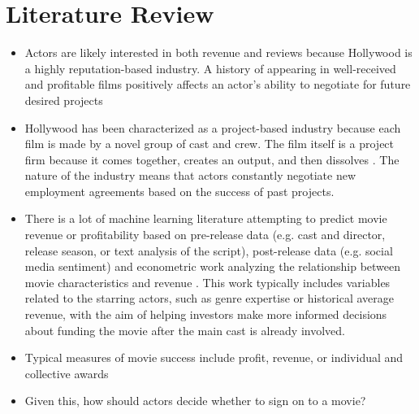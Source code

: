 \documentclass{article}
\begin{document}
\section{Literature Review}
\begin{itemize}
    \item Actors are likely interested in both revenue and reviews because Hollywood is a highly reputation-based industry. A history of appearing in well-received and profitable films positively affects an actor's ability to negotiate for future desired projects \cite{ebbers}
    \item Hollywood has been characterized as a project-based industry because each film is made by a novel group of cast and crew. The film itself is a project firm because it comes together, creates an output, and then dissolves \cite{ferriani}\cite{jones}. The nature of the industry means that actors constantly negotiate new employment agreements based on the success of past projects.
    \item There is a lot of machine learning literature attempting to predict movie revenue or profitability based on pre-release data (e.g. cast and director, release season, or text analysis of the script), post-release data (e.g. social media sentiment) and econometric work analyzing the relationship between movie characteristics and revenue \cite{lash}\cite{baimbridge}\cite{boccardelli}\cite{elberse}\cite{eliashberg}\cite{parimi}\cite{simonoff}\cite{gopinath}\cite{apala}. This work typically includes variables related to the starring actors, such as genre expertise\cite{lash} or historical average revenue\cite{elberse}, with the aim of helping investors make more informed decisions about funding the movie after the main cast is already involved.
    \item Typical measures of movie success include profit\cite{lash}, revenue\cite{apala}\cite{gopinath}\cite{parimi}\cite{simonoff}, or individual and collective awards\cite{cattani}
    \item Given this, how should actors decide whether to sign on to a movie?
\end{itemize}
\end{document}

